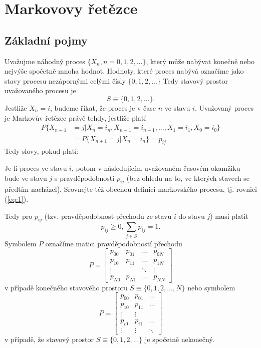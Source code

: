 \documentclass[10pt]{article}
\begin{document}
\section{Markovovy řetězce}
\subsection{Základní pojmy}
Uvažujme náhodný proces $\{X_n, n=0,1,2,... \}$, který může nabývat konečně nebo nejvýše spočetně mnoha hodnot. Hodnoty, které proces nabývá označíme jako stavy procesu nezápornými celými čísly $\{0,1,2,...\}$ Tedy stavový prostor uvažovaného procesu je $$S \equiv \{0,1,2,...\}.$$ Jestliže $X_n=i$, budeme říkat, že proces je v čase $n$ ve stavu $i$. Uvažovaný proces je Markovův řetězec právě tehdy, jestliže platí \begin{equation}
\begin{split}
P\{X_{n+1}	&=j|X_{n}=i_{n},X_{n-1}=i_{n-1},...,X_{1}=i_{1},X_{0}=i_{0}\}\\
			&=P\{X_{n+1}=j|X_{n}=i_{n}\}=p_{ij}
\end{split}
\end{equation}
Tedy slovy, pokud platí:

Je-li proces ve stavu $i$, potom v následujícím uvažovaném časovém okamžiku bude ve stavu $j$ s pravděpodobností $p_{ij}$ (bez ohledu na to, ve kterých stavech se předtím nacházel). Srovnejte též obecnou definici markovského procesu, tj. rovnici (\ref{eq:1}).

Tedy pro $p_{ij}$ (tzv. pravděpodobnost přechodu ze stavu $i$ do stavu $j$) musí platit \begin{equation}p_{ij}\geq 0, \sum_{j \in S} p_{ij} = 1.\end{equation} Symbolem $P$ označíme matici pravděpodobností přechodu $$P = 
\begin{bmatrix}
  p_{00} & p_{01} & \dots & p_{0N} \\
  p_{10} & p_{11} & \dots & p_{1N} \\
  \vdots &&\ddots&\vdots\\
  p_{N0} & p_{N1} & \dots & p_{NN}
 \end{bmatrix}$$ v případě konečného stavového prostoru $S \equiv \{0,1,2,...,N\}$ nebo symbolem $$P = 
\begin{bmatrix}
  p_{00} & p_{01} & \dots \\
  p_{10} & p_{11} & \dots\\
  \vdots &\vdots&\\
  p_{i0} & p_{i1} & \dots\\
  \vdots &\vdots&\ddots
 \end{bmatrix}$$ 
 v případě, že stavový prostor $S \equiv \{0,1,2,...\}$ je spočetně nekonečný.
\end{document}
